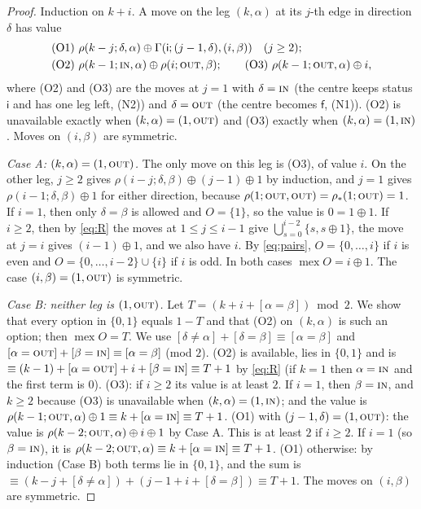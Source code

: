 \documentclass[11pt]{amsart}
\theoremstyle{definition}
\theoremstyle{remark}
\newcommand{\mex}{\operatorname{mex}}
\newcommand{\si}{\mathsf{i}}
\newcommand{\sff}{\mathsf{f}}
\newcommand{\free}{\ast}
\newcommand{\IN}{\textup{\textsc{in}}}
\newcommand{\OUT}{\textup{\textsc{out}}}
\begin{document}
\begin{proof}
Induction on $k+i$. A move on the leg $(k,\alpha)$ at its $j$-th edge in direction $\delta$ has value
\begin{align*}
&\text{(O1) } \rho(k-j;\delta,\alpha)\oplus\Gamma(\si;(j-1,\delta),(i,\beta))\quad (j\ge2);\\
&\text{(O2) } \rho(k-1;\IN,\alpha)\oplus\rho(i;\OUT,\beta);\qquad
\text{(O3) } \rho(k-1;\OUT,\alpha)\oplus i,
\end{align*}
where (O2) and (O3) are the moves at $j=1$ with $\delta=\IN$ (the centre keeps status $\si$ and has one leg left, (N2)) and $\delta=\OUT$ (the centre becomes $\sff$, (N1)). (O2) is unavailable exactly when $(k,\alpha)=(1,\OUT)$ and (O3) exactly when $(k,\alpha)=(1,\IN)$. Moves on $(i,\beta)$ are symmetric.

\emph{Case A: $(k,\alpha)=(1,\OUT)$.} The only move on this leg is (O3), of value $i$. On the other leg, $j\ge2$ gives $\rho(i-j;\delta,\beta)\oplus(j-1)\oplus1$ by induction, and $j=1$ gives $\rho(i-1;\delta,\beta)\oplus1$ for either direction, because $\rho(1;\OUT,\OUT)=\rho_\free(1;\OUT)=1$. If $i=1$, then only $\delta=\beta$ is allowed and $O=\{1\}$, so the value is $0=1\oplus1$. If $i\ge2$, then by \eqref{eq:R} the moves at $1\le j\le i-1$ give $\bigcup_{s=0}^{i-2}\{s,s\oplus1\}$, the move at $j=i$ gives $(i-1)\oplus1$, and we also have $i$. By \eqref{eq:pairs}, $O=\{0,\dots,i\}$ if $i$ is even and $O=\{0,\dots,i-2\}\cup\{i\}$ if $i$ is odd. In both cases $\mex O=i\oplus1$. The case $(i,\beta)=(1,\OUT)$ is symmetric.

\emph{Case B: neither leg is $(1,\OUT)$.} Let $T=(k+i+[\alpha=\beta])\bmod 2$. We show that every option in $\{0,1\}$ equals $1-T$ and that (O2) on $(k,\alpha)$ is such an option; then $\mex O=T$. We use $[\delta\ne\alpha]+[\delta=\beta]\equiv[\alpha=\beta]$ and $[\alpha=\OUT]+[\beta=\IN]\equiv[\alpha=\beta]$ (mod $2$).
(O2) is available, lies in $\{0,1\}$ and is $\equiv (k-1)+[\alpha=\OUT]+i+[\beta=\IN]\equiv T+1$ by \eqref{eq:R} (if $k=1$ then $\alpha=\IN$ and the first term is $0$).
(O3): if $i\ge2$ its value is at least $2$. If $i=1$, then $\beta=\IN$, and $k\ge2$ because (O3) is unavailable when $(k,\alpha)=(1,\IN)$; and the value is $\rho(k-1;\OUT,\alpha)\oplus1\equiv k+[\alpha=\IN]\equiv T+1$.
(O1) with $(j-1,\delta)=(1,\OUT)$: the value is $\rho(k-2;\OUT,\alpha)\oplus i\oplus1$ by Case A. This is at least $2$ if $i\ge2$. If $i=1$ (so $\beta=\IN$), it is $\rho(k-2;\OUT,\alpha)\equiv k+[\alpha=\IN]\equiv T+1$.
(O1) otherwise: by induction (Case B) both terms lie in $\{0,1\}$, and the sum is $\equiv(k-j+[\delta\neq\alpha])+(j-1+i+[\delta=\beta])\equiv T+1$.
The moves on $(i,\beta)$ are symmetric.
\end{proof}
\end{document}
